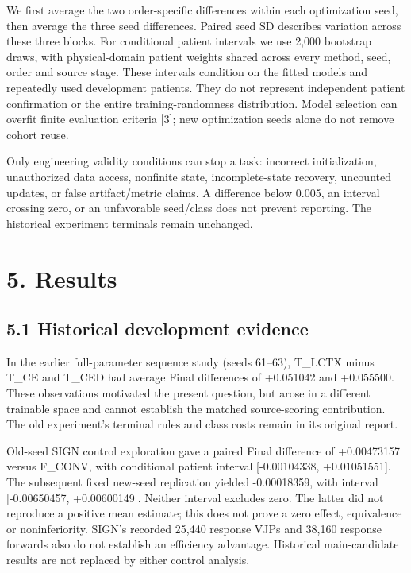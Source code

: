 \documentclass[
]{article}
\begin{document}
We first average the two order-specific differences within each
optimization seed, then average the three seed differences. Paired seed
SD describes variation across these three blocks. For conditional
patient intervals we use 2,000 bootstrap draws, with physical-domain
patient weights shared across every method, seed, order and source
stage. These intervals condition on the fitted models and repeatedly
used development patients. They do not represent independent patient
confirmation or the entire training-randomness distribution. Model
selection can overfit finite evaluation criteria {[}3{]}; new
optimization seeds alone do not remove cohort reuse.

Only engineering validity conditions can stop a task: incorrect
initialization, unauthorized data access, nonfinite state,
incomplete-state recovery, uncounted updates, or false artifact/metric
claims. A difference below 0.005, an interval crossing zero, or an
unfavorable seed/class does not prevent reporting. The historical
experiment terminals remain unchanged.

\section{5. Results}\label{results}

\subsection{5.1 Historical development
evidence}\label{historical-development-evidence}

In the earlier full-parameter sequence study (seeds 61--63), T\_LCTX
minus T\_CE and T\_CED had average Final differences of +0.051042 and
+0.055500. These observations motivated the present question, but arose
in a different trainable space and cannot establish the matched
source-scoring contribution. The old experiment's terminal rules and
class costs remain in its original report.

Old-seed SIGN control exploration gave a paired Final difference of
+0.00473157 versus F\_CONV, with conditional patient interval
{[}-0.00104338, +0.01051551{]}. The subsequent fixed new-seed
replication yielded -0.00018359, with interval {[}-0.00650457,
+0.00600149{]}. Neither interval excludes zero. The latter did not
reproduce a positive mean estimate; this does not prove a zero effect,
equivalence or noninferiority. SIGN's recorded 25,440 response VJPs and
38,160 response forwards also do not establish an efficiency advantage.
Historical main-candidate results are not replaced by either control
analysis.
\end{document}
